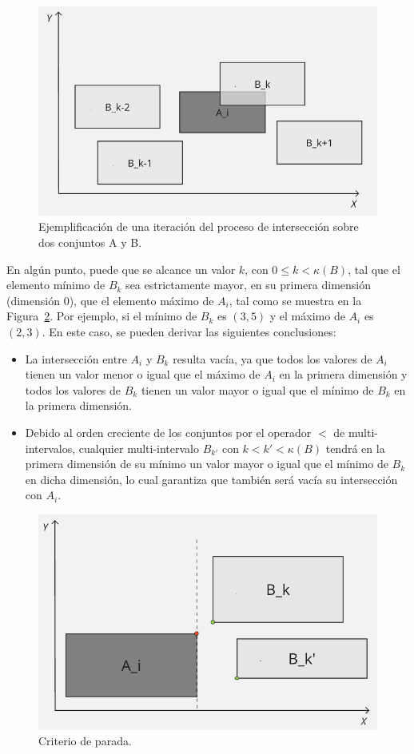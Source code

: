 \begin{figure}[h]
     \centering
    \includegraphics[width=0.75\linewidth]{figures/Optimazaciones/Interseccion/interseccion1a1.png}\par
    \caption{Ejemplificación de una iteración del proceso de intersección sobre dos conjuntos A y B.}
    \label{fig:int-graf}
\end{figure}

En algún punto, puede que se alcance un valor $k$, con $0 \leq k < \kappa(B)$, tal que el elemento mínimo de $B_k$ sea estrictamente mayor, en su primera dimensión (dimensión $0$), que el elemento máximo de $A_i$, tal como se muestra en la Figura~\ref{fig:criterio-parada}. Por ejemplo, si el mínimo de $B_k$ es $(3,5)$ y el máximo de $A_i$ es  $(2,3)$. En este caso, se pueden derivar las siguientes conclusiones:

\begin{itemize}
     \item La intersección entre $A_i$ y $B_k$ resulta vacía, ya que todos los valores de $A_i$ tienen un valor menor o igual que el máximo de $A_i$ en la primera dimensión y todos los valores de $B_k$ tienen un valor mayor o igual que el mínimo de $B_k$ en la primera dimensión.
    
    \item Debido al orden creciente de los conjuntos por el operador $<$ de multi-intervalos, cualquier multi-intervalo $B_{k'}$ con $k < k' < \kappa(B)$ tendrá en la primera dimensión de su mínimo un valor mayor o igual que el mínimo de $B_k$ en dicha dimensión, lo cual garantiza que también será vacía su intersección con $A_i$.
\end{itemize}

\begin{figure}[h]
    \centering
    \includegraphics[width=0.75\linewidth]{figures/Optimazaciones/Interseccion/criterio de parada.png}
    \caption{Criterio de parada.}
    \label{fig:criterio-parada}
\end{figure}

